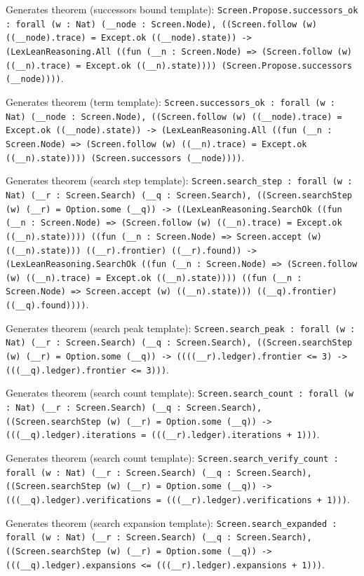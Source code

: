 \documentclass[11pt]{article}
\begin{document}
\noindent Generates theorem (successors bound template): \texttt{Screen.Propose.successors\_ok : forall (w : Nat) (\_\_node : Screen.Node), ((Screen.follow (w) ((\_\_node).trace) = Except.ok ((\_\_node).state)) -> (LexLeanReasoning.All ((fun (\_\_n : Screen.Node) => (Screen.follow (w) ((\_\_n).trace) = Except.ok ((\_\_n).state)))) (Screen.Propose.successors (\_\_node))))}.\par
\noindent Generates theorem (term template): \texttt{Screen.successors\_ok : forall (w : Nat) (\_\_node : Screen.Node), ((Screen.follow (w) ((\_\_node).trace) = Except.ok ((\_\_node).state)) -> (LexLeanReasoning.All ((fun (\_\_n : Screen.Node) => (Screen.follow (w) ((\_\_n).trace) = Except.ok ((\_\_n).state)))) (Screen.successors (\_\_node))))}.\par
\noindent Generates theorem (search step template): \texttt{Screen.search\_step : forall (w : Nat) (\_\_r : Screen.Search) (\_\_q : Screen.Search), ((Screen.searchStep (w) (\_\_r) = Option.some (\_\_q)) -> ((LexLeanReasoning.SearchOk ((fun (\_\_n : Screen.Node) => (Screen.follow (w) ((\_\_n).trace) = Except.ok ((\_\_n).state)))) ((fun (\_\_n : Screen.Node) => Screen.accept (w) ((\_\_n).state))) ((\_\_r).frontier) ((\_\_r).found)) -> (LexLeanReasoning.SearchOk ((fun (\_\_n : Screen.Node) => (Screen.follow (w) ((\_\_n).trace) = Except.ok ((\_\_n).state)))) ((fun (\_\_n : Screen.Node) => Screen.accept (w) ((\_\_n).state))) ((\_\_q).frontier) ((\_\_q).found))))}.\par
\noindent Generates theorem (search peak template): \texttt{Screen.search\_peak : forall (w : Nat) (\_\_r : Screen.Search) (\_\_q : Screen.Search), ((Screen.searchStep (w) (\_\_r) = Option.some (\_\_q)) -> ((((\_\_r).ledger).frontier <= 3) -> (((\_\_q).ledger).frontier <= 3)))}.\par
\noindent Generates theorem (search count template): \texttt{Screen.search\_count : forall (w : Nat) (\_\_r : Screen.Search) (\_\_q : Screen.Search), ((Screen.searchStep (w) (\_\_r) = Option.some (\_\_q)) -> (((\_\_q).ledger).iterations = (((\_\_r).ledger).iterations + 1)))}.\par
\noindent Generates theorem (search count template): \texttt{Screen.search\_verify\_count : forall (w : Nat) (\_\_r : Screen.Search) (\_\_q : Screen.Search), ((Screen.searchStep (w) (\_\_r) = Option.some (\_\_q)) -> (((\_\_q).ledger).verifications = (((\_\_r).ledger).verifications + 1)))}.\par
\noindent Generates theorem (search expansion template): \texttt{Screen.search\_expanded : forall (w : Nat) (\_\_r : Screen.Search) (\_\_q : Screen.Search), ((Screen.searchStep (w) (\_\_r) = Option.some (\_\_q)) -> (((\_\_q).ledger).expansions <= (((\_\_r).ledger).expansions + 1)))}.\par
\end{document}
